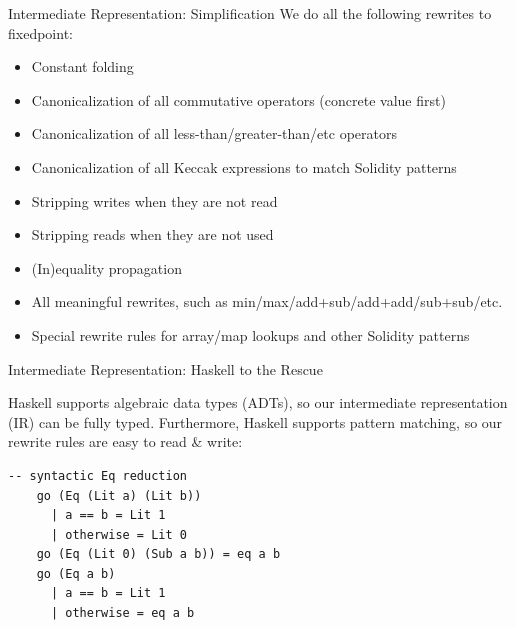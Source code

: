 \documentclass[aspectratio=169]{beamer}
\begin{document}
\begin{frame}[fragile=singleslide]{Intermediate Representation: Simplification} 
We do all the following rewrites to fixedpoint:
\begin{itemize}
\item Constant folding
\item Canonicalization of all commutative operators (concrete value first)
\item Canonicalization of all less-than/greater-than/etc operators
\item Canonicalization of all Keccak expressions to match Solidity patterns
\item Stripping writes when they are not read
\item Stripping reads when they are not used
\item (In)equality propagation
\item All meaningful rewrites, such as min/max/add+sub/add+add/sub+sub/etc.
\item Special rewrite rules for array/map lookups and other Solidity patterns
\end{itemize}
\end{frame}

\begin{frame}[fragile=singleslide]{Intermediate Representation: Haskell to the Rescue}

Haskell supports algebraic data types (ADTs), so our intermediate representation (IR) can be fully typed. Furthermore, Haskell supports pattern matching, so our rewrite rules are easy to read \& write:
\begin{Verbatim}[frame=single, framerule=0.2mm, framesep=2mm,fontsize=\small]
    -- syntactic Eq reduction
    go (Eq (Lit a) (Lit b))
      | a == b = Lit 1
      | otherwise = Lit 0
    go (Eq (Lit 0) (Sub a b)) = eq a b
    go (Eq a b)
      | a == b = Lit 1
      | otherwise = eq a b
\end{Verbatim}
\end{frame}

%
\end{document}
